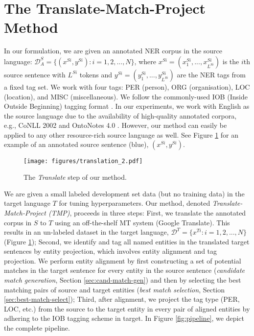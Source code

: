 \documentclass[11pt,a4paper]{article}
\begin{document}
%
 

\section{The Translate-Match-Project Method \label{sec:tmp}}

In our formulation, we are given an annotated NER corpus in the source language: 
$\mathcal{D}^S_A = \{(x^{Si}, y^{Si}): i = 1, 2, ..., N\}$, 
where $x^{Si} = (x^{Si}_1,...,x^{Si}_{L^{Si}})$ 
is the $i$th source sentence with $L^{Si}$ tokens 
and $y^{Si} = (y^{Si}_1,...,y^{Si}_{L^{Si}})$ 
are the NER tags from a fixed tag set. 
We work with four tags: PER (person), ORG (organisation), 
LOC (location), and MISC (miscellaneous). 
We follow the commonly-used IOB (Inside Outside Beginning) 
tagging format \cite{ramshaw1999text}. 
In our experiments, we work with English as the source language
due to the availability of high-quality annotated corpora, 
e.g., CoNLL 2002 \citep{sang2002introduction} 
and OntoNotes 4.0 \citep{weischedel2011ontonotes}. However, our method can easily be applied to any other resource-rich source language as well.
See Figure \ref{fig:translate} for an example 
of an annotated source sentence (blue), $(x^{Si}, y^{Si})$.

\begin{figure}[t!]
    \centering
    \texttt{[image: figures/translation\_2.pdf]}
    \caption{The \emph{Translate} step of our method.}
\label{fig:translate}
\end{figure}

We are given a small labeled development set data 
(but no training data)
in the target language $T$ for tuning hyperparameters.
Our method, denoted \emph{Translate-Match-Project (TMP)}, proceeds in three steps:
First, we translate the annotated corpus in $S$ to $T$
using an off-the-shelf MT system (Google Translate). 
This results in an un-labeled dataset in the target language, 
$\mathcal{D}^T = \{x^{Ti}: i = 1, 2, ..., N\}$ (Figure \ref{fig:translate});
Second, we identify and tag all named entities in the translated target sentences 
by entity projection, which involves entity alignment and tag projection.
We perform entity alignment by first constructing 
a set of potential matches in the target sentence 
for every entity in the source sentence 
(\textit{candidate match generation}, Section \ref{sec:cand-match-gen}) 
and then by selecting the best matching pairs of source and target entities 
(\textit{best match selection}, Section \ref{sec:best-match-select}); 
Third, after alignment, we project the tag type (PER, LOC, etc.) from the source to the target entity 
in every pair of aligned entities 
by adhering to the IOB tagging scheme in target. 
In Figure \ref{fig:pipeline}, we depict the complete pipeline.
\end{document}
